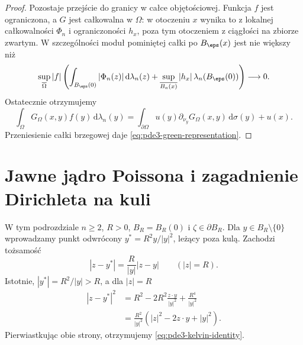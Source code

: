 \begin{proof}
Pozostaje przejście do granicy w całce objętościowej.
Funkcja $f$ jest ograniczona, a $G$ jest całkowalna
w $\Omega$: w otoczeniu $x$ wynika to z lokalnej
całkowalności $\Phi_n$ i ograniczoności $h_x$,
poza tym otoczeniem z ciągłości na zbiorze zwartym.
W szczególności moduł pominiętej całki po $B_\eps(x)$
jest nie większy niż
\[
 \sup_{\overline\Omega}|f|
 \left(\int_{B_\eps(0)}|\Phi_n(z)|\,\mathrm d\lambda_n(z)
 +\sup_{\overline{B_a(x)}}|h_x|\,\lambda_n(B_\eps(0))\right)
 \longrightarrow0.
\]
Ostatecznie otrzymujemy
\[
 \int_\Omega G_\Omega(x,y)f(y)\,\mathrm d\lambda_n(y)
 =\int_{\partial\Omega}u(y)\partial_{\nu_y}G_\Omega(x,y)
 \,\mathrm d\sigma(y)+u(x).
\]
Przeniesienie całki brzegowej daje
\eqref{eq:pde3-green-representation}.
\end{proof}

\section{Jawne jądro Poissona i zagadnienie Dirichleta na kuli}
\label{sec:pde3-poisson-kernel}

W tym podrozdziale $n\geq2$, $R>0$,
$B_R=B_R(0)$ i $\zeta\in\partial B_R$.
Dla $y\in B_R\setminus\{0\}$ wprowadzamy punkt odwrócony
$y^*=R^2y/|y|^2$, leżący poza kulą. Zachodzi tożsamość
\begin{equation}\label{eq:pde3-kelvin-identity}
 |z-y^*|=\frac R{|y|}|z-y| \qquad (|z|=R).
\end{equation}
Istotnie, $|y^*|=R^2/|y|>R$, a dla $|z|=R$
\[
 \begin{aligned}
 |z-y^*|^2
 &=R^2-2R^2\frac{z\cdot y}{|y|^2}
       +\frac{R^4}{|y|^2}\\
 &=\frac{R^2}{|y|^2}(|z|^2-2z\cdot y+|y|^2).
 \end{aligned}
\]
Pierwiastkując obie strony, otrzymujemy
\eqref{eq:pde3-kelvin-identity}.

